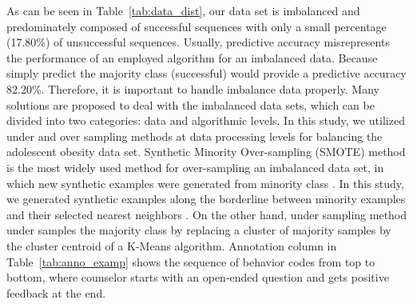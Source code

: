 \documentclass{amia_summit_2018}
\begin{document}
As can be seen in Table~\ref{tab:data_dist}, our data set is imbalanced and predominately composed of successful sequences with only a small percentage (17.80\%) of unsuccessful sequences. Usually, predictive accuracy misrepresents the performance of an employed algorithm for an imbalanced data. Because simply predict the majority class (successful) would provide a predictive accuracy 82.20\%. Therefore, it is important to handle imbalance data properly. Many solutions are proposed to deal with the imbalanced data sets, which can be divided into two categories: data and algorithmic levels. In this study, we utilized under and over sampling methods at data processing levels for balancing the adolescent obesity data set. Synthetic Minority Over-sampling (SMOTE) method is the most widely used method for over-sampling an imbalanced data set, in which new synthetic examples were generated from minority class \cite{chawla2002smote}. In this study, we generated synthetic examples along the borderline between minority examples and their selected nearest neighbors \cite{nguyen2011borderline}. On the other hand, under sampling method under samples the majority class by replacing a cluster of majority samples by the cluster centroid of a K-Means algorithm. Annotation column in Table~\ref{tab:anno_examp} shows the sequence of behavior codes from top to bottom, where counselor starts with an open-ended question and gets positive feedback at the end. \\
\end{document}
